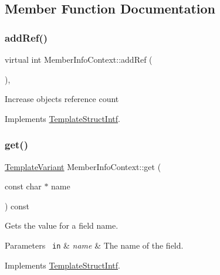 \subsection{Member Function Documentation}
\mbox{\label{class_member_info_context_a9f19c4a3fb7164d1daf4772d4de3703f}} 
\subsubsection{\texorpdfstring{addRef()}{addRef()}}
{\footnotesize\ttfamily virtual int Member\+Info\+Context\+::add\+Ref (\begin{DoxyParamCaption}{ }\end{DoxyParamCaption})\hspace{0.3cm}{\ttfamily [inline]}, {\ttfamily [virtual]}}

Increase object\textquotesingle{}s reference count 

Implements \mbox{\hyperlink{class_template_struct_intf_a05fe97ad47633beb326f69686faed581}{Template\+Struct\+Intf}}.

\mbox{\label{class_member_info_context_a320895b057801bfc3d53c281d9c565d8}} 
\subsubsection{\texorpdfstring{get()}{get()}}
{\footnotesize\ttfamily \mbox{\hyperlink{class_template_variant}{Template\+Variant}} Member\+Info\+Context\+::get (\begin{DoxyParamCaption}\item[{const char $\ast$}]{name }\end{DoxyParamCaption}) const\hspace{0.3cm}{\ttfamily [virtual]}}

Gets the value for a field name. 
\begin{DoxyParams}[1]{Parameters}
\mbox{\texttt{ in}}  & {\em name} & The name of the field. \\
\hline
\end{DoxyParams}


Implements \mbox{\hyperlink{class_template_struct_intf_a3d610cb81b4adbb531ebed3aa3d09b51}{Template\+Struct\+Intf}}.

